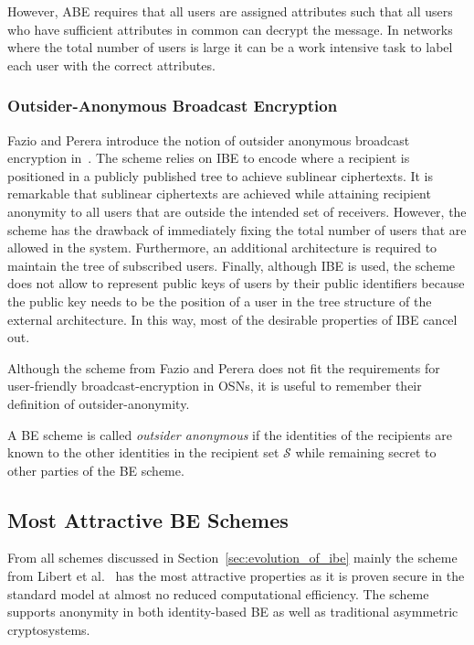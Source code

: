 However, ABE requires that all users are assigned attributes such that all users who have sufficient attributes in common can decrypt the message. In networks where the total number of users is large it can be a work intensive task to label each user with the correct attributes.

\subsubsection{Outsider-Anonymous Broadcast Encryption}
Fazio and Perera introduce the notion of outsider anonymous broadcast encryption in~\cite{art:FazioP12}. The scheme relies on IBE to encode where a recipient is positioned in a publicly published tree to achieve sublinear ciphertexts. It is remarkable that sublinear ciphertexts are achieved while attaining recipient anonymity to all users that are outside the intended set of receivers. However, the scheme has the drawback of immediately fixing the total number of users that are allowed in the system. Furthermore, an additional architecture is required to maintain the tree of subscribed users. Finally, although IBE is used, the scheme does not allow to represent public keys of users by their public identifiers because the public key needs to be the position of a user in the tree structure of the external architecture. In this way, most of the desirable properties of IBE cancel out.

Although the scheme from Fazio and Perera does not fit the requirements for user-friendly broadcast-encryption in OSNs, it is useful to remember their definition of outsider-anonymity.

\begin{defn}
\label{def:outsider_anonymity}
 A BE scheme is called \textit{outsider anonymous} if the identities of the recipients are known to the other identities in the recipient set $\mathcal{S}$ while remaining secret to other parties of the BE scheme.
\end{defn}

\subsection{Most Attractive BE Schemes}
From all schemes discussed in Section~\ref{sec:evolution_of_ibe} mainly the scheme from Libert et al.~\cite{art:LibertQ03} has the most attractive properties as it is proven secure in the standard model at almost no reduced computational efficiency. The scheme supports anonymity in both identity-based BE as well as traditional asymmetric cryptosystems.


